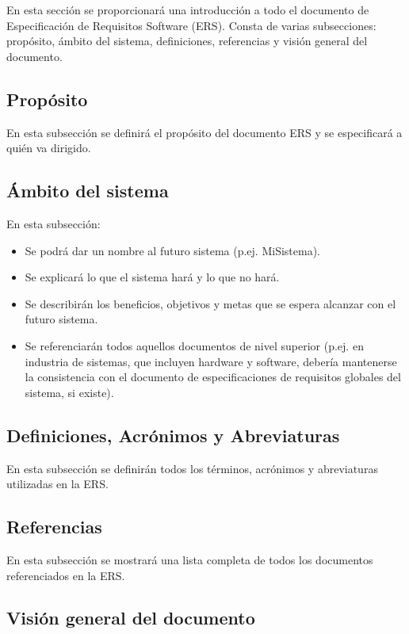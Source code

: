 \documentclass[12pt,a4paper]{article}
\begin{document}
En esta sección se proporcionará una introducción a todo el documento de Especificación de Requisitos Software (ERS). Consta de varias subsecciones: propósito, ámbito del sistema, definiciones, referencias y visión general del documento.

\subsection{Propósito}
\label{sec:proposito}

En esta subsección se definirá el propósito del documento ERS y se especificará a quién va dirigido.

\subsection{Ámbito del sistema}
\label{sec:ambito_sistema}

En esta subsección:
\begin{itemize}
    \item Se podrá dar un nombre al futuro sistema (p.ej. MiSistema).
    \item Se explicará lo que el sistema hará y lo que no hará.
    \item Se describirán los beneficios, objetivos y metas que se espera alcanzar con el futuro sistema.
    \item Se referenciarán todos aquellos documentos de nivel superior (p.ej. en industria de sistemas, que incluyen hardware y software, debería mantenerse la consistencia con el documento de especificaciones de requisitos globales del sistema, si existe).
\end{itemize}

\subsection{Definiciones, Acrónimos y Abreviaturas}
\label{sec:definiciones}

En esta subsección se definirán todos los términos, acrónimos y abreviaturas utilizadas en la ERS.

\subsection{Referencias}
\label{sec:referencias}

En esta subsección se mostrará una lista completa de todos los documentos referenciados en la ERS.

\subsection{Visión general del documento}
\label{sec:vision_general}
\end{document}
